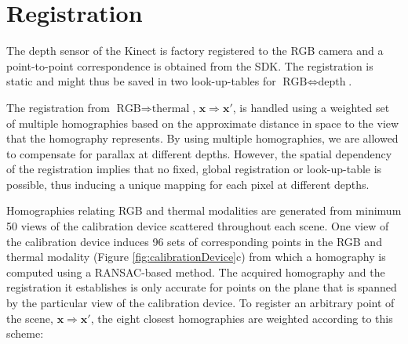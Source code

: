 \documentclass[10pt,twocolumn,letterpaper]{article}
\begin{document}
\section{Registration}
\label{sec:registration}
The depth sensor of the Kinect is factory registered to the RGB camera and a point-to-point correspondence is obtained from the SDK. The registration is static and might thus be saved in two look-up-tables for $\text{RGB} \Leftrightarrow \text{depth}$. %

The registration from $\text{RGB} \Rightarrow \text{thermal}$, $\mathbf{x} \Rightarrow \mathbf{x}'$, is handled using a weighted set of multiple homographies based on the approximate distance in space to the view that the homography represents. By using multiple homographies, we are allowed to compensate for parallax at different depths. However, the spatial dependency of the registration implies that no fixed, global registration or look-up-table is possible, thus inducing a unique mapping for each pixel at different depths.

Homographies relating RGB and thermal modalities are generated from minimum 50 views of the calibration device scattered throughout each scene. One view of the calibration device induces 96 sets of corresponding points in the RGB and thermal modality (Figure \ref{fig:calibrationDevice}c) from which a homography is computed using a RANSAC-based method. The acquired homography and the registration it establishes is only accurate for points on the plane that is spanned by the particular view of the calibration device. To register an arbitrary point of the scene, $\mathbf{x} \Rightarrow \mathbf{x}'$, the eight closest homographies are weighted according to this scheme:
\end{document}
